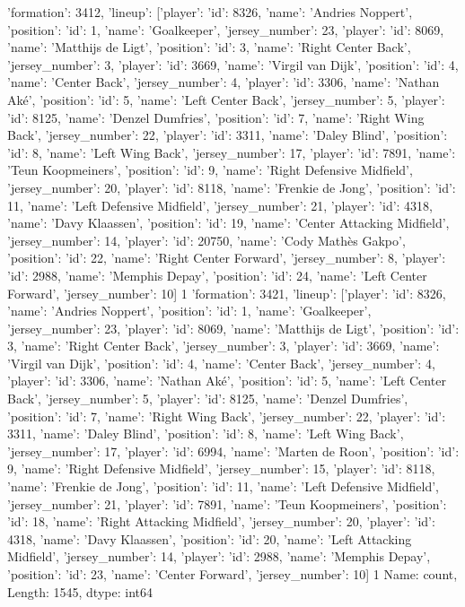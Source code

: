{'formation': 3412, 'lineup': [{'player': {'id': 8326, 'name': 'Andries Noppert'}, 'position': {'id': 1, 'name': 'Goalkeeper'}, 'jersey_number': 23}, {'player': {'id': 8069, 'name': 'Matthijs de Ligt'}, 'position': {'id': 3, 'name': 'Right Center Back'}, 'jersey_number': 3}, {'player': {'id': 3669, 'name': 'Virgil van Dijk'}, 'position': {'id': 4, 'name': 'Center Back'}, 'jersey_number': 4}, {'player': {'id': 3306, 'name': 'Nathan Aké'}, 'position': {'id': 5, 'name': 'Left Center Back'}, 'jersey_number': 5}, {'player': {'id': 8125, 'name': 'Denzel Dumfries'}, 'position': {'id': 7, 'name': 'Right Wing Back'}, 'jersey_number': 22}, {'player': {'id': 3311, 'name': 'Daley Blind'}, 'position': {'id': 8, 'name': 'Left Wing Back'}, 'jersey_number': 17}, {'player': {'id': 7891, 'name': 'Teun Koopmeiners'}, 'position': {'id': 9, 'name': 'Right Defensive Midfield'}, 'jersey_number': 20}, {'player': {'id': 8118, 'name': 'Frenkie de Jong'}, 'position': {'id': 11, 'name': 'Left Defensive Midfield'}, 'jersey_number': 21}, {'player': {'id': 4318, 'name': 'Davy Klaassen'}, 'position': {'id': 19, 'name': 'Center Attacking Midfield'}, 'jersey_number': 14}, {'player': {'id': 20750, 'name': 'Cody Mathès Gakpo'}, 'position': {'id': 22, 'name': 'Right Center Forward'}, 'jersey_number': 8}, {'player': {'id': 2988, 'name': 'Memphis Depay'}, 'position': {'id': 24, 'name': 'Left Center Forward'}, 'jersey_number': 10}]}                                                 1
{'formation': 3421, 'lineup': [{'player': {'id': 8326, 'name': 'Andries Noppert'}, 'position': {'id': 1, 'name': 'Goalkeeper'}, 'jersey_number': 23}, {'player': {'id': 8069, 'name': 'Matthijs de Ligt'}, 'position': {'id': 3, 'name': 'Right Center Back'}, 'jersey_number': 3}, {'player': {'id': 3669, 'name': 'Virgil van Dijk'}, 'position': {'id': 4, 'name': 'Center Back'}, 'jersey_number': 4}, {'player': {'id': 3306, 'name': 'Nathan Aké'}, 'position': {'id': 5, 'name': 'Left Center Back'}, 'jersey_number': 5}, {'player': {'id': 8125, 'name': 'Denzel Dumfries'}, 'position': {'id': 7, 'name': 'Right Wing Back'}, 'jersey_number': 22}, {'player': {'id': 3311, 'name': 'Daley Blind'}, 'position': {'id': 8, 'name': 'Left Wing Back'}, 'jersey_number': 17}, {'player': {'id': 6994, 'name': 'Marten de Roon'}, 'position': {'id': 9, 'name': 'Right Defensive Midfield'}, 'jersey_number': 15}, {'player': {'id': 8118, 'name': 'Frenkie de Jong'}, 'position': {'id': 11, 'name': 'Left Defensive Midfield'}, 'jersey_number': 21}, {'player': {'id': 7891, 'name': 'Teun Koopmeiners'}, 'position': {'id': 18, 'name': 'Right Attacking Midfield'}, 'jersey_number': 20}, {'player': {'id': 4318, 'name': 'Davy Klaassen'}, 'position': {'id': 20, 'name': 'Left Attacking Midfield'}, 'jersey_number': 14}, {'player': {'id': 2988, 'name': 'Memphis Depay'}, 'position': {'id': 23, 'name': 'Center Forward'}, 'jersey_number': 10}]}                                                       1
Name: count, Length: 1545, dtype: int64

